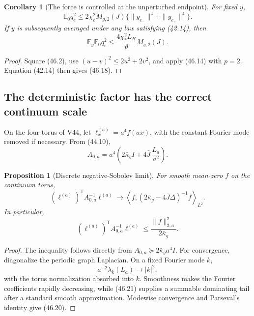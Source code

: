 \documentclass[11pt]{article}
\newtheorem{proposition}[theorem]{Proposition}
\newtheorem{corollary}[theorem]{Corollary}
\theoremstyle{remark}
\begin{document}
\begin{corollary}[The force is controlled at the unperturbed endpoint]
\label{cor:v17v46-force-zero}
For fixed \(y\),
\[
 \mathbb E_0 q_e^2
 \leq
 2\chi_e^2M_{g,2}(J)
 \{\|y_{e_-}\|^4+\|y_{e_+}\|^4\}.                 \tag{46.17}
\]
If \(y\) is subsequently averaged under any law satisfying (42.14),
then
\[
 \mathbb E_y\mathbb E_0q_e^2
 \leq
 \frac{4\chi_*^2L_H}{\vartheta}M_{g,2}(J).         \tag{46.18}
\]
\end{corollary}

\begin{proof}
Square (46.2), use \((u-v)^2\leq2u^2+2v^2\), and apply (46.14) with
\(p=2\).  Equation (42.14) then gives (46.18).
\end{proof}

\subsection{The deterministic factor has the correct continuum scale}

On the four-torus of V44, let
\(\ell_x^{(a)}=a^4f(ax)\), with the constant Fourier mode removed if
necessary.  From (44.10),
\[
 A_{0,a}
 =
 a^4\left(
 2\bar\kappa_gI+
 4\bar J\,\frac{L_a}{a^2}
 \right).                                        \tag{46.19}
\]

\begin{proposition}[Discrete negative-Sobolev limit]
\label{prop:v17v46-hminus}
For smooth mean-zero \(f\) on the continuum torus,
\[
 (\ell^{(a)})^{\mathsf T}A_{0,a}^{-1}\ell^{(a)}
 \longrightarrow
 \left\langle
 f,(2\bar\kappa_g-4\bar J\Delta)^{-1}f
 \right\rangle_{L^2}.                             \tag{46.20}
\]
In particular,
\[
 (\ell^{(a)})^{\mathsf T}A_{0,a}^{-1}\ell^{(a)}
 \leq\frac{\|f\|_{2,a}^2}{2\bar\kappa_g}.         \tag{46.21}
\]
\end{proposition}

\begin{proof}
The inequality follows directly from
\(A_{0,a}\succeq2\bar\kappa_ga^4I\).  For convergence, diagonalize the
periodic graph Laplacian.  On a fixed Fourier mode \(k\),
\[
 a^{-2}\lambda_k(L_a)
 \longrightarrow |k|^2,                          \tag{46.22}
\]
with the torus normalization absorbed into \(k\).  Smoothness makes
the Fourier coefficients rapidly decreasing, while (46.21) supplies
a summable dominating tail after a standard smooth approximation.
Modewise convergence and Parseval's identity give (46.20).
\end{proof}
\end{document}
